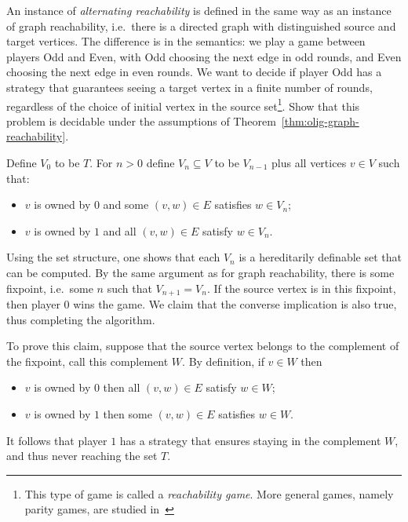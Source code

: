  \mikexercise
{\label{ex:alternating-reachability} An instance of \emph{alternating reachability} is defined in the same way as an instance of graph reachability, i.e.~there is a directed graph with distinguished source and target vertices. The difference is in the semantics: we play a game between players Odd and Even, with Odd choosing the next edge in odd rounds, and Even choosing the next edge in even rounds. We want to decide if player Odd has a strategy that guarantees seeing a target vertex in a finite number of rounds, regardless of the choice of initial vertex in the source set\footnote{This type of game is called a \emph{reachability game}. More general games, namely parity games, are studied in~\cite[Section 5.2]{klin2017modal}}.  Show that this problem is decidable under the assumptions of Theorem~\ref{thm:olig-graph-reachability}. 
} { Define $V_0$ to be $T$. For $n > 0$ define $V_n \subseteq V$ to be $V_{n-1}$ plus all vertices $v \in V$ such that:
\begin{itemize}
	\item $v$ is owned by $0$ and some $(v,w) \in E$ satisfies $w \in V_n$;
	\item $v$ is owned by $1$ and all $(v,w) \in E$ satisfy $w \in V_n$.
\end{itemize}
Using the set structure, one shows that each $V_n$ is a hereditarily definable set that can be computed. 
By the same argument as for graph reachability, there is some fixpoint, i.e.~some $n$ such that $V_{n+1}=V_n$. If the source vertex is in this fixpoint, then player $0$ wins the game. We claim that the converse implication is also true, thus completing the algorithm. 

To prove this claim, suppose that the source vertex belongs to the complement of the fixpoint, call this complement $W$. By definition, if $v \in W$ then 
\begin{itemize}
	\item $v$ is owned by $0$ then all $(v,w) \in E$ satisfy $w \in W$;
	\item $v$ is owned by $1$ then some $(v,w) \in E$ satisfies $w \in W$.
\end{itemize}
It follows that player $1$ has a strategy that ensures staying in the complement $W$, and thus never reaching the set $T$. 
}


